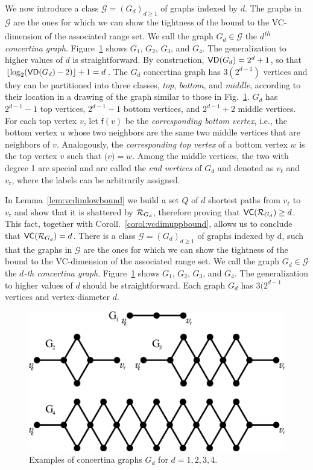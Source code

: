 \ifproof
We now introduce a class $\mathcal{G}=(G_d)_{d\ge 1}$ of graphs indexed by $d$.
The graphs in $\mathcal{G}$ are the ones for which we can show the tightness of
the bound to the VC-dimension of the associated range set.
We call the graph $G_d\in\mathcal{G}$ the \emph{$d$\textsuperscript{th} concertina graph}.
Figure~\ref{fig:tightgraphs} shows $G_1$, $G_2$, $G_3$, and $G_4$. The
generalization to higher values of $d$ is straightforward.
By construction, $\mathsf{VD}(G_d)=2^d+1$, so that
$\lfloor\log_2(\mathsf{VD}(G_d)-2)\rfloor+1=d$. The $G_d$ concertina graph has 
$3(2^{d-1})$ vertices and they can be partitioned into three classes,
\emph{top}, \emph{bottom}, and \emph{middle},
according to their location in a drawing of the graph similar to those in
Fig.~\ref{fig:tightgraphs}. $G_d$ has $2^{d-1}-1$ top vertices, $2^{d-1}-1$
bottom vertices, and $2^{d-1}+2$ middle vertices. For each top vertex $v$, let
$\mathsf{f}(v)$ be the \emph{corresponding bottom vertex}, i.e., the bottom
vertex $u$ whose two neighbors are the same two middle vertices that are
neighbors of $v$. Analogously, the \emph{corresponding top vertex} of a bottom
vertex $w$ is the top vertex $v$ such that $\mathsf(v)=w$. Among the middle
vertices, the two with degree 1 are special and are called the \emph{end
vertices} of $G_d$ and denoted as $v_\ell$ and $v_\mathrm{r}$, where the labels
can be arbitrarily assigned. 

In Lemma~\ref{lem:vcdimlowbound} we build a set $Q$ of $d$ shortest paths from
$v_\ell$ to $v_\mathrm{r}$ and show that it is shattered by $\mathcal{R}_{G_d}$,
therefore proving that $\mathsf{VC}(\mathcal{R}_{G_d})\ge d$. This fact, together with
Coroll.~\ref{corol:vcdimuppbound}, allows us to conclude that $\mathsf{VC}(\mathcal{R}_{G_d})=d$. 
\else
There is a class $\mathcal{G}=(G_d)_{d\ge 1}$ of graphs indexed by d, such that
the graphs in $\mathcal{G}$ are the ones for which we can show the tightness of
the bound to the VC-dimension of the associated range set. We call the graph
$G_d\in\mathcal{G}$ the \emph{$d$-th concertina graph}.
Figure~\ref{fig:tightgraphs} shows $G_1$, $G_2$, $G_3$, and $G_4$. The
generalization to higher values of $d$ should be straightforward. Each graph
$G_d$ has $3(2^{d-1}$ vertices and vertex-diameter $d$.

\fi

\begin{figure}[th]
  \centering
  \includegraphics[scale=0.3]{figures/eps/tight}
  \caption{Examples of concertina graphs $G_d$ for $d=1,2,3,4$.}
  \label{fig:tightgraphs}
\end{figure}

